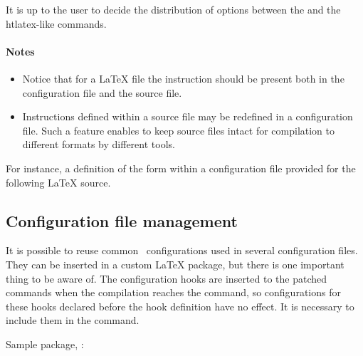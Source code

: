 It is up to the user to decide the distribution of options between the
\texcommand{\Preamble} and the htlatex-like commands.

\begin{texsource}
 
\EndPreamble 
\end{texsource}

\paragraph{Notes}

\begin{itemize}
  \item Notice that for a LaTeX file the \texcommand{}
    instruction should be present both in the configuration file and the source
    file.

  \item Instructions defined within a source file may be redefined in a
    configuration file. Such a feature enables to keep source files intact for
    compilation to different formats by different tools.
\end{itemize}

For instance, a definition of the form  within a
configuration file provided for the following LaTeX source.


\subsection{Configuration file management}

It is possible to reuse common \texfourht\ configurations used in several
configuration files.  They can be inserted in a custom LaTeX package, but there
is one important thing to be aware of. The configuration hooks are inserted to
the patched commands when the compilation reaches the  
\texcommand{} command, so configurations for these hooks
declared before the hook definition have no effect. It is necessary to include
them in the \texcommand{\AtBeginDocument} command.

Sample package, :

